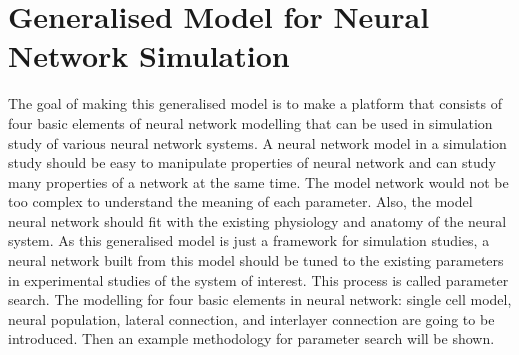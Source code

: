 %


\section{Generalised Model for Neural Network Simulation}
The goal of making this generalised model is to make a platform that consists of four basic elements of neural network modelling that can be used in simulation study of various neural network systems. A neural network model in a simulation study should be easy to manipulate properties of neural network and can study many properties of a network at the same time. The model network would not be too complex to understand the meaning of each parameter. 
Also, the model neural network should fit with the existing physiology and anatomy of the neural system.
As this generalised model is just a framework for simulation studies, a neural network built from this model should be tuned to the existing parameters in experimental studies of the system of interest. This process is called parameter search.
The modelling for four basic elements in neural network: single cell model, neural population, lateral connection, and interlayer connection are going to be introduced. Then an example methodology for parameter search will be shown.

